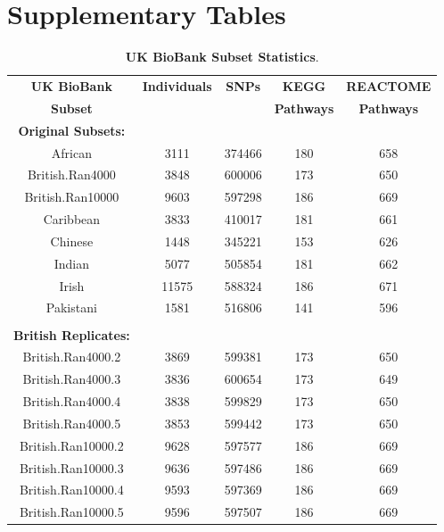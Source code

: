 \documentclass[12pt, a4paper]{article}
\begin{document}
\section{Supplementary Tables}\label{Supplementary-Tables}

\begin{table}[ht]
\centering
\begin{tabular}{ccccc}
  \hline
\textbf{UK BioBank} & \textbf{Individuals} & \textbf{SNPs} & \textbf{KEGG} & \textbf{REACTOME} \\
\textbf{Subset} & & & \textbf{Pathways} & \textbf{Pathways}  \\
  \hline
\textbf{Original Subsets:} & & & & \\
African & 3111 & 374466 & 180 & 658 \\ 
British.Ran4000 & 3848 & 600006 & 173 & 650 \\ 
British.Ran10000 & 9603 & 597298 & 186 & 669 \\ 
Caribbean & 3833 & 410017 & 181 & 661 \\ 
Chinese & 1448 & 345221 & 153 & 626 \\ 
Indian & 5077 & 505854 & 181 & 662 \\ 
Irish & 11575 & 588324 & 186 & 671 \\ 
Pakistani & 1581 & 516806 & 141 & 596 \\ 
\\
\textbf{British Replicates:} & & & & \\
British.Ran4000.2 & 3869 & 599381 & 173 & 650 \\ 
British.Ran4000.3 & 3836 & 600654 & 173 & 649 \\ 
British.Ran4000.4 & 3838 & 599829 & 173 & 650 \\ 
British.Ran4000.5 & 3853 & 599442 & 173 & 650 \\ 
British.Ran10000.2 & 9628 & 597577 & 186 & 669 \\ 
British.Ran10000.3 & 9636 & 597486 & 186 & 669 \\ 
British.Ran10000.4 & 9593 & 597369 & 186 & 669 \\ 
British.Ran10000.5 & 9596 & 597507 & 186 & 669 \\ 
  \hline
\end{tabular}
\caption[TBD]{\textbf{UK BioBank Subset Statistics}. \\ }
\label{InterPath-Supp-Table-UKBPopStats}
\end{table}
\clearpage
\end{document}
